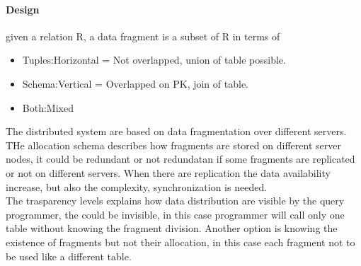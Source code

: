 \documentclass[12pt]{article}
\begin{document}
\paragraph{Design} given a relation R, a data fragment is a subset of R in terms of
\begin{itemize}
  \item Tuples:Horizontal = Not overlapped, union of table possible.
  \item Schema:Vertical = Overlapped on PK, join of table.
  \item Both:Mixed
\end{itemize}
The distributed system are based on data fragmentation over different servers. THe allocation schema describes how fragments are stored on different server nodes, it could be redundant or not redundatan if some fragments are replicated or not on different servers. When there are replication the data availability increase, but also the complexity, synchronization is needed.\\
The trasparency levels explains how data distribution are visible by the query programmer, the could be invisible, in this case programmer will call only one table without knowing the fragment division. Another option is knowing the existence of fragments but not their allocation, in this case each fragment not to be used like a different table.
\end{document}
